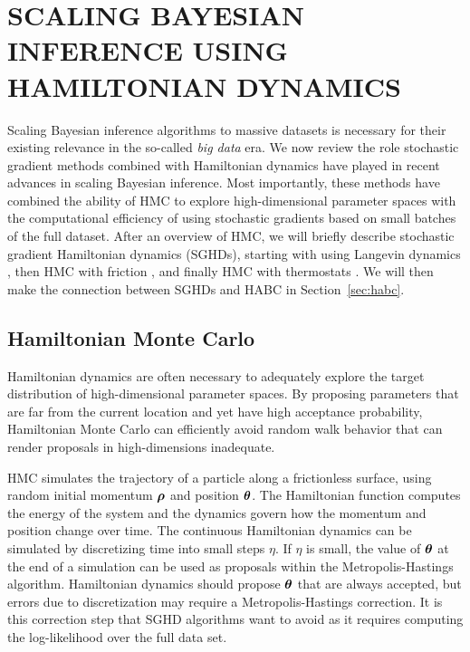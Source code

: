 \documentclass[]{article}
\begin{document}
\section{SCALING BAYESIAN INFERENCE USING HAMILTONIAN DYNAMICS} \label{sec:sghd-data}
Scaling Bayesian inference algorithms to massive datasets is necessary for their existing relevance in the so-called {\em big data} era.  We now review the role stochastic gradient methods combined with Hamiltonian dynamics have played in recent advances in scaling Bayesian inference.   Most importantly, these methods have combined the ability of HMC to explore high-dimensional parameter spaces with the computational efficiency of using stochastic gradients based on small batches of the full dataset.  After an overview of HMC, we will briefly describe stochastic gradient Hamiltonian dynamics (SGHDs), starting with using  Langevin dynamics \cite{welling2011bayesian}, then HMC with friction \cite{chen2014stochastic}, and finally HMC with thermostats \cite{ding2014bayesian}.  We will then make the connection between SGHDs and HABC in Section~\ref{sec:habc}.

\subsection{Hamiltonian Monte Carlo}

Hamiltonian dynamics are often necessary to adequately explore the target distribution of high-dimensional parameter spaces.  By proposing parameters that are far from the current location and yet have high acceptance probability, Hamiltonian Monte Carlo \cite{duane1987hybrid, neal2011mcmc}  can efficiently avoid random walk behavior that can render proposals in high-dimensions inadequate.

HMC simulates the trajectory of a particle along a frictionless surface, using random initial momentum ${\bm \rho}$ and position ${\bm \theta}$.  The Hamiltonian function computes the energy of the system and the dynamics govern how the momentum and position change over time.  The continuous Hamiltonian dynamics can be simulated by discretizing time into small steps $\eta$.  If $\eta$ is small, the value of ${\bm \theta}$ at the end of a simulation can be used as proposals within the Metropolis-Hastings algorithm.  Hamiltonian dynamics should propose ${\bm \theta}$ that are always accepted, but errors due to discretization may require a  Metropolis-Hastings correction.  It is this correction step that SGHD algorithms want to avoid as it requires computing the log-likelihood over the full data set.
\end{document}
